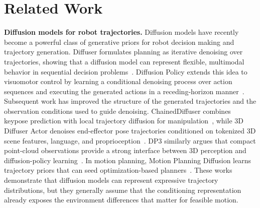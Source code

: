 \section{Related Work}\label{sec:related-work}

\textbf{Diffusion models for robot trajectories.}
Diffusion models have recently become a powerful class of generative priors for robot decision making and trajectory generation. Diffuser formulates planning as iterative denoising over trajectories, showing that a diffusion model can represent flexible, multimodal behavior in sequential decision problems~\cite{janner2022diffuser}. Diffusion Policy extends this idea to visuomotor control by learning a conditional denoising process over action sequences and executing the generated actions in a receding-horizon manner~\cite{chi2025diffusionpolicy}. Subsequent work has improved the structure of the generated trajectories and the observation conditions used to guide denoising. ChainedDiffuser combines keypose prediction with local trajectory diffusion for manipulation~\cite{xian2023chaineddiffuser}, while 3D Diffuser Actor denoises end-effector pose trajectories conditioned on tokenized 3D scene features, language, and proprioception~\cite{ke2025threediffuseractor}. DP3 similarly argues that compact point-cloud observations provide a strong interface between 3D perception and diffusion-policy learning~\cite{ze2024dp3}. In motion planning, Motion Planning Diffusion learns trajectory priors that can seed optimization-based planners~\cite{carvalho2023motionplanningdiffusion}. These works demonstrate that diffusion models can represent expressive trajectory distributions, but they generally assume that the conditioning representation already exposes the environment differences that matter for feasible motion.

